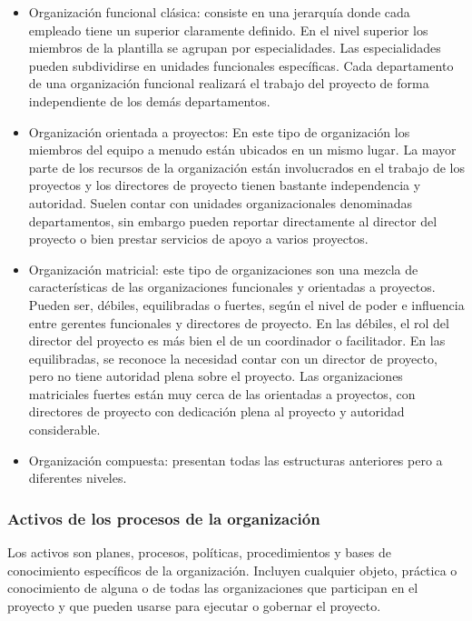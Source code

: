\begin{itemize}
\item{Organización funcional clásica: consiste en una jerarquía donde cada empleado tiene un superior claramente definido. En el nivel superior los miembros de la plantilla se agrupan por especialidades. Las especialidades pueden subdividirse en unidades funcionales específicas. Cada departamento de una organización funcional realizará el trabajo del proyecto de forma independiente de los demás departamentos. }

\item{Organización orientada a proyectos: En este tipo de organización los miembros del equipo a menudo están ubicados en un mismo lugar. La mayor parte de los recursos de la organización están involucrados en el trabajo de los proyectos y los directores de proyecto tienen bastante independencia y autoridad. Suelen contar con unidades organizacionales denominadas departamentos, sin embargo pueden reportar directamente al director del proyecto o bien prestar servicios de apoyo a varios proyectos.}

\item{Organización matricial: este tipo de organizaciones son una mezcla de características de las organizaciones funcionales y orientadas a proyectos. Pueden ser, débiles, equilibradas o fuertes, según el nivel de poder e influencia entre gerentes funcionales y directores de proyecto. En las débiles, el rol del director del proyecto es más bien el de un coordinador o facilitador. En las equilibradas, se reconoce la necesidad contar con un director de proyecto, pero no tiene autoridad plena sobre el proyecto. Las organizaciones matriciales fuertes están muy cerca de las orientadas a proyectos, con directores de proyecto con dedicación plena al proyecto y autoridad considerable.}

\item{Organización compuesta: presentan todas las estructuras anteriores pero a diferentes niveles.}

\end{itemize}

\subsubsection{Activos de los procesos de la organización}

Los activos son planes, procesos, políticas, procedimientos y bases de conocimiento específicos de la organización. Incluyen cualquier objeto, práctica o conocimiento de alguna o de todas las organizaciones que participan en el proyecto y que pueden usarse para ejecutar o gobernar el proyecto.

